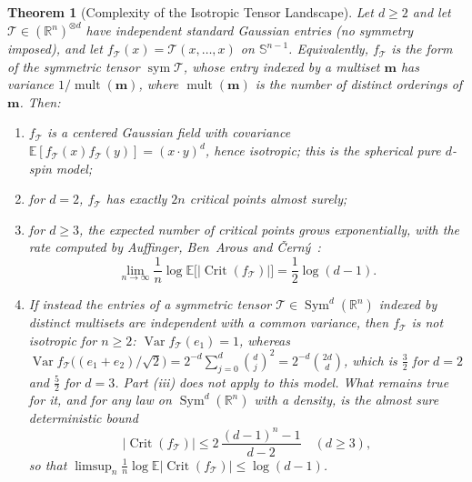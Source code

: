 \documentclass[11pt,a4paper,reqno]{amsart}
\newtheorem{theorem}{Theorem}[section]
\theoremstyle{definition}
\numberwithin{equation}{section}
\providecommand{\R}{\mathbb{R}}
\providecommand{\Sph}{\mathbb{S}}
\begin{document}
\begin{theorem}[Complexity of the Isotropic Tensor Landscape]
\label{thm:kac_rice_tensors}
Let $d \ge 2$ and let $\mathcal{T} \in (\R^n)^{\otimes d}$ have independent standard Gaussian entries (no symmetry imposed), and let $f_{\mathcal{T}}(x) = \mathcal{T}(x, \dots, x)$ on $\Sph^{n-1}$. Equivalently, $f_{\mathcal{T}}$ is the form of the symmetric tensor $\operatorname{sym}\mathcal{T}$, whose entry indexed by a multiset $\mathbf{m}$ has variance $1/\operatorname{mult}(\mathbf{m})$, where $\operatorname{mult}(\mathbf{m})$ is the number of distinct orderings of $\mathbf{m}$. Then:
\begin{enumerate}[label=(\roman*)]
    \item $f_{\mathcal{T}}$ is a centered Gaussian field with covariance $\mathbb{E}[f_{\mathcal{T}}(x) f_{\mathcal{T}}(y)] = (x \cdot y)^d$, hence isotropic; this is the spherical pure $d$-spin model;
    \item for $d = 2$, $f_{\mathcal{T}}$ has exactly $2n$ critical points almost surely;
    \item for $d \ge 3$, the expected number of critical points grows exponentially, with the rate computed by Auffinger, Ben~Arous and \v{C}ern\'y~\cite{auffinger2013random}:
    \begin{equation}
        \label{eq:abc_complexity}
        \lim_{n \to \infty} \frac{1}{n} \log \mathbb{E}\big[|\operatorname{Crit}(f_{\mathcal{T}})|\big] = \frac{1}{2} \log(d-1).
    \end{equation}
    \item If instead the entries of a symmetric tensor $\mathcal{T} \in \operatorname{Sym}^d(\R^n)$ indexed by distinct multisets are independent with a common variance, then $f_{\mathcal{T}}$ is not isotropic for $n \ge 2$: $\operatorname{Var} f_{\mathcal{T}}(e_1) = 1$, whereas $\operatorname{Var} f_{\mathcal{T}}\big((e_1+e_2)/\sqrt{2}\big) = 2^{-d}\sum_{j=0}^d \binom{d}{j}^2 = 2^{-d}\binom{2d}{d}$, which is $\tfrac32$ for $d=2$ and $\tfrac52$ for $d=3$. Part (iii) does not apply to this model. What remains true for it, and for any law on $\operatorname{Sym}^d(\R^n)$ with a density, is the almost sure deterministic bound
    \begin{equation}
        \label{eq:cs_bound}
        |\operatorname{Crit}(f_{\mathcal{T}})| \le 2\, \frac{(d-1)^n - 1}{d-2} \quad (d \ge 3),
    \end{equation}
    so that $\limsup_n \frac1n \log \mathbb{E}|\operatorname{Crit}(f_{\mathcal{T}})| \le \log(d-1)$.
\end{enumerate}
\end{theorem}
\end{document}
